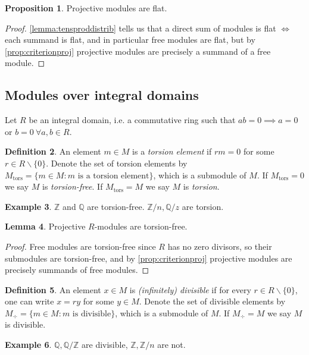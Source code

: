 \documentclass{article}
\newcommand{\Z}{\mathbb{Z}}
\newcommand{\Q}{\mathbb{Q}}
\newcommand{\tors}{{\operatorname{tors}}}
\theoremstyle{definition}
\newtheorem{defn}{Definition}[subsection]
\newtheorem{prop}[defn]{Proposition}
\newtheorem{lemma}[defn]{Lemma}
\newtheorem{example}[defn]{Example}
\begin{document}
\begin{prop}
Projective modules are flat.
\end{prop}
\begin{proof}
\ref{lemma:tensproddistrib} tells us that a direct sum of modules is flat $\iff$ each summand is flat, and in particular free modules are flat, but by \ref{prop:criterionproj} projective modules are precisely a summand of a free module.
\end{proof}

\subsection{Modules over integral domains}
Let $R$ be an integral domain, i.e. a commutative ring such that $ab=0\implies a=0$ or $b=0 \ \forall a,b\in R$.

\begin{defn}
An element $m\in M$ is a \textit{torsion element} if $rm=0$ for some $r\in R\backslash\{0\}$. Denote the set of torsion elements by $M_\tors=\{m\in M:m\text{ is a torsion element}\}$, which is a submodule of $M$. If $M_\tors=0$ we say $M$ is \textit{torsion-free}. If $M_\tors=M$ we say $M$ is \textit{torsion}.
\end{defn}

\begin{example}
$\Z$ and $\Q$ are torsion-free. $\Z/n,\Q/z$ are torsion.
\end{example}

\begin{lemma}
Projective $R$-modules are torsion-free.
\end{lemma}
\begin{proof}
Free modules are torsion-free since $R$ has no zero divisors, so their submodules are torsion-free, and by \ref{prop:criterionproj} projective modules are precisely summands of free modules.
\end{proof}

\begin{defn}
An element $x\in M$ is \textit{(infinitely) divisible} if for every $r\in R\backslash\{0\}$, one can write $x=ry$ for some $y\in M$. Denote the set of divisible elements by $M_\div=\{m\in M:m\text{ is divisible}\}$, which is a submodule of $M$. If $M_\div=M$ we say $M$ is divisible.
\end{defn}

\begin{example}
$\Q,\Q/\Z$ are divisible, $\Z,\Z/n$ are not.
\end{example}
\end{document}
